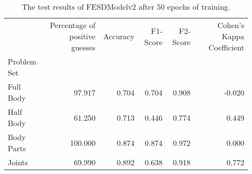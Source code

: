 \begin{table}[!htbp]
  \caption[Test Results of FESDModelv2]{The test results of FESDModelv2 after 50 epochs of training.}
  \label{tab:res_v2}
  \begin{tabular}{lrrrrr}
    \hline
    {} &  Percentage of positive guesses &  Accuracy &  F1-Score &  F2-Score &  Cohen's Kappa Coefficient \\
    Problem Set   &                                 &           &           &           &                            \\
    \hline
    Full Body  &                          97.917 &     0.704 &     0.704 &     0.908 &                     -0.020 \\
    Half Body  &                          61.250 &     0.713 &     0.446 &     0.774 &                      0.449 \\
    Body Parts &                         100.000 &     0.874 &     0.874 &     0.972 &                      0.000 \\
    Joints     &                          69.990 &     0.892 &     0.638 &     0.918 &                      0.772 \\
    \hline
  \end{tabular}

\end{table}